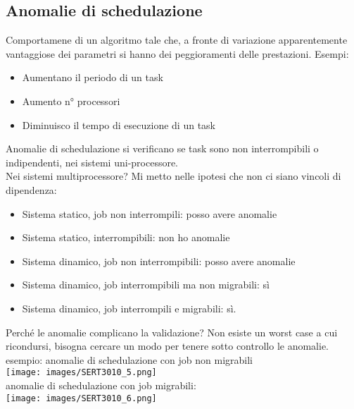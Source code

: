 \documentclass[18px]{article}
\begin{document}
\subsection{Anomalie di schedulazione}
Comportamene di un algoritmo tale che, a fronte di variazione apparentemente vantaggiose dei parametri si hanno dei peggioramenti delle prestazioni. Esempi:
\begin{itemize}
\item Aumentano il periodo di un task
\item Aumento n° processori
\item Diminuisco il tempo di esecuzione di un task
\end{itemize}
Anomalie di schedulazione si verificano se task sono non interrompibili o indipendenti, nei sistemi uni-processore.\\ Nei sistemi multiprocessore? Mi metto nelle ipotesi che non ci siano vincoli di dipendenza:\\
\begin{itemize}
\item Sistema statico, job non interrompili: posso avere anomalie
\item Sistema statico, interrompibili: non ho anomalie
\item Sistema dinamico, job non interrompibili: posso avere anomalie
\item Sistema dinamico, job interrompibili ma non migrabili: sì
\item Sistema dinamico, job interrompili e migrabili: sì.
\end{itemize}
Perché le anomalie complicano la validazione? Non esiste un worst case a cui ricondursi, bisogna cercare un modo per tenere sotto controllo le anomalie.\\ esempio: anomalie di schedulazione con job non migrabili\\
\texttt{[image: images/SERT3010\_5.png]}\\
anomalie di schedulazione con job migrabili:\\
\texttt{[image: images/SERT3010\_6.png]}
\end{document}
